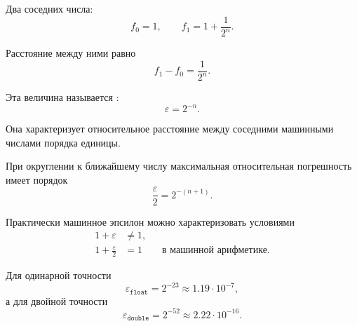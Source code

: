 \documentclass[../final.tex]{subfiles}
\begin{document}
Два соседних числа:
%
\begin{equation*}
    f_0=1,
    \qquad
    f_1
    =
    1+\frac{1}{2^n}.
\end{equation*}

Расстояние между ними равно
%
\begin{equation*}
    f_1-f_0
    =
    \frac{1}{2^n}.
\end{equation*}

Эта величина называется :
%
\begin{equation*}
    \boxed{
        \varepsilon
        =
        2^{-n}
    }.
\end{equation*}

Она характеризует относительное расстояние между соседними
машинными числами порядка единицы.

При округлении к ближайшему числу максимальная относительная
погрешность имеет порядок
%
\begin{equation*}
    \frac{\varepsilon}{2}
    =
    2^{-(n+1)}.
\end{equation*}

Практически машинное эпсилон можно характеризовать условиями
%
\begin{align*}
    1+\varepsilon
    &\neq
    1,
    \\[3pt]
    1+\frac{\varepsilon}{2}
    &=
    1
    \qquad
    \text{в машинной арифметике}.
\end{align*}

Для одинарной точности
%
\begin{equation*}
    \varepsilon_{\texttt{float}}
    =
    2^{-23}
    \approx
    1.19\cdot10^{-7},
\end{equation*}
%
а для двойной точности
%
\begin{equation*}
    \varepsilon_{\texttt{double}}
    =
    2^{-52}
    \approx
    2.22\cdot10^{-16}.
\end{equation*}
\end{document}
